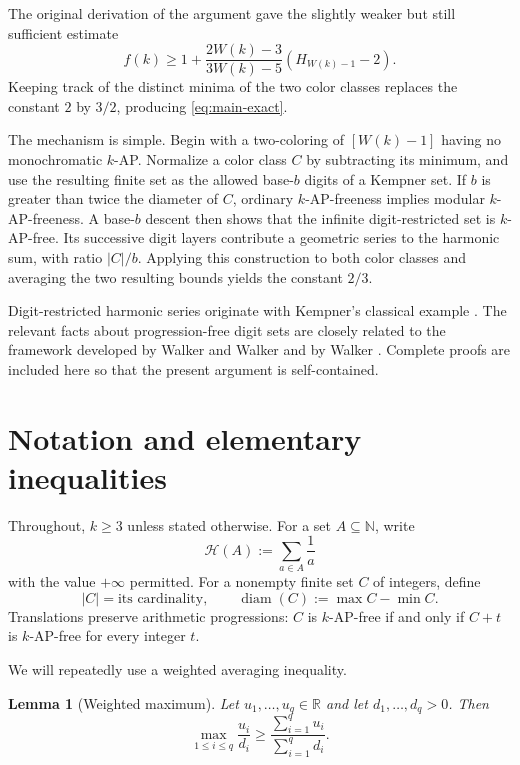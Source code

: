 \documentclass[11pt]{article}
\newtheorem{lemma}[theorem]{Lemma}
\theoremstyle{definition}
\theoremstyle{remark}
\newcommand{\N}{\mathbb{N}}
\newcommand{\HH}{\mathcal{H}}
\newcommand{\diam}{\operatorname{diam}}
\begin{document}
The original derivation of the argument gave the slightly weaker but still
sufficient estimate
\begin{equation}\label{eq:advertised-bound}
 f(k)\ge
 1+\frac{2W(k)-3}{3W(k)-5}
 \left(H_{W(k)-1}-2\right).
\end{equation}
Keeping track of the distinct minima of the two color classes replaces the
constant $2$ by $3/2$, producing \cref{eq:main-exact}.

The mechanism is simple.  Begin with a two-coloring of
$[W(k)-1]$ having no monochromatic $k$-AP.  Normalize a color class $C$ by
subtracting its minimum, and use the resulting finite set as the allowed
base-$b$ digits of a Kempner set.  If $b$ is greater than twice the diameter
of $C$, ordinary $k$-AP-freeness implies modular $k$-AP-freeness.  A
base-$b$ descent then shows that the infinite digit-restricted set is
$k$-AP-free.  Its successive digit layers contribute a geometric series to
the harmonic sum, with ratio $|C|/b$.  Applying this construction to both
color classes and averaging the two resulting bounds yields the constant
$2/3$.

Digit-restricted harmonic series originate with Kempner's classical example
\cite{kempner-1914}.  The relevant facts about progression-free digit sets
are closely related to the framework developed by Walker and Walker
\cite{walker-walker-2020} and by Walker \cite{walker-2025}.  Complete proofs
are included here so that the present argument is self-contained.

\section{Notation and elementary inequalities}

Throughout, $k\ge 3$ unless stated otherwise.  For a set
$A\subseteq\N$, write
\[
 \HH(A):=\sum_{a\in A}\frac1a
\]
with the value $+\infty$ permitted.  For a nonempty finite set $C$ of
integers, define
\[
 |C|=\text{its cardinality},\qquad
 \diam(C):=\max C-\min C.
\]
Translations preserve arithmetic progressions: $C$ is $k$-AP-free if and
only if $C+t$ is $k$-AP-free for every integer $t$.

We will repeatedly use a weighted averaging inequality.

\begin{lemma}[Weighted maximum]\label{lem:weighted-max}
Let $u_1,\ldots,u_q\in\mathbb{R}$ and let $d_1,\ldots,d_q>0$.  Then
\begin{equation}\label{eq:weighted-max}
 \max_{1\le i\le q}\frac{u_i}{d_i}
 \ge
 \frac{\sum_{i=1}^q u_i}{\sum_{i=1}^q d_i}.
\end{equation}
\end{lemma}
\end{document}
